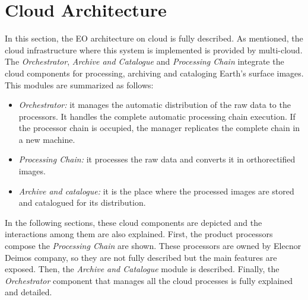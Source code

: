 \section{Cloud Architecture}

In this section, the \ac{EO} architecture on cloud is fully described. As
mentioned, the cloud infrastructure where this system is implemented is provided
by \bonfire multi-cloud. The \emph{Orchestrator}, \emph{Archive and Catalogue} and \emph{Processing
Chain} integrate the cloud components for processing, archiving and cataloging
Earth's surface images. This modules are summarized as follows:
\begin{itemize}
\item \emph{Orchestrator:} it manages the automatic distribution of the raw data to the processors. It handles the complete automatic processing chain execution.  If the processor chain is occupied, the manager replicates the complete chain in a new machine.
\item \emph{Processing Chain:} it processes the raw data and converts it in orthorectified images. 
\item \emph{Archive and catalogue:} it is the place where the processed images are stored and catalogued for its distribution.
\end{itemize}

In the following sections, these cloud components are
depicted and the interactions among them are also explained. First, the product
processors compose the \emph{Processing Chain} are shown. These processors are owned
by Elecnor Deimos company, so they are not fully described but the main features
are exposed. Then, the \emph{Archive and Catalogue}
module is described. Finally, the \emph{Orchestrator} component that manages all the
cloud processes is fully explained and detailed.
 


